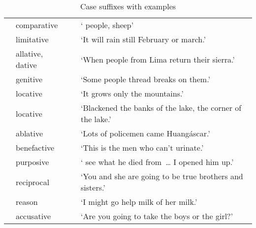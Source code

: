 \begin{table}[t]
\small\centering
\caption{Case suffixes with examples}\label{Tab11}
\begin{tabularx}{\textwidth}{l@{\hspace{1ex}}l@{\hspace{1ex}}L@{\hspace{1ex}}L}
\lsptoprule
{} & comparative &  & ‘ people,  sheep’	\\
 & limitative &  & ‘It will rain still  February or march.’	\\
 & allative, \mbox{dative}&  & ‘When people from Lima return  their sierra.’ \\
 & genitive &  & ‘Some people thread breaks on them.’	\\
 & locative &  & ‘It grows only  the mountains.’	\\
 & locative &  & ‘Blackened  the banks of the lake,  the corner of the lake.’	\\
 & ablative &  & ‘Lots of policemen came  Huangáscar.’	\\
 & benefactive &  & ‘This is  the men who can’t urinate.’	\\
 & purposive &  & ‘ see what he died from~\dots{} I opened him up.’	\\
 & reciprocal &  & ‘You and she are going to be true brothers and sisters.’	\\
 & reason &  & ‘I might go help milk  of her milk.’	\\
 & accusative &  & ‘Are you going to take the boys or the girl?’	\\

\end{tabularx}
\end{table}
